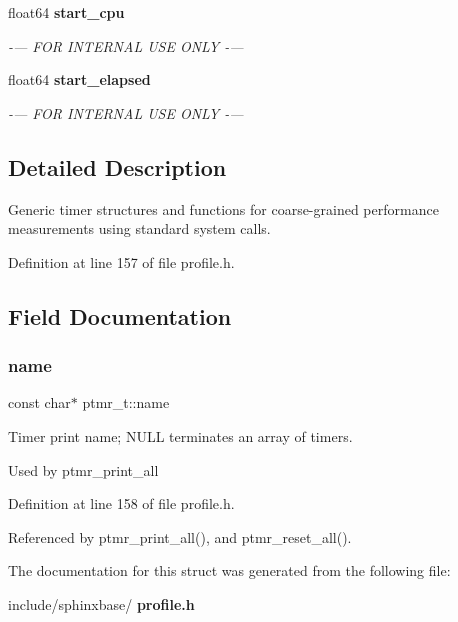 \begin{DoxyCompactItemize}
\mbox{\label{structptmr__t_a85c0c5f0e321cf11fb478b92a05223e8}} 
float64 \textbf{ start\+\_\+cpu}
\begin{DoxyCompactList}\small\item\em -\/--- F\+OR I\+N\+T\+E\+R\+N\+AL U\+SE O\+N\+LY -\/--- \end{DoxyCompactList}\item 
\mbox{\label{structptmr__t_a1702b16a6c6bcb82f6c636f5e68af188}} 
float64 \textbf{ start\+\_\+elapsed}
\begin{DoxyCompactList}\small\item\em -\/--- F\+OR I\+N\+T\+E\+R\+N\+AL U\+SE O\+N\+LY -\/--- \end{DoxyCompactList}\end{DoxyCompactItemize}


\subsection{Detailed Description}
Generic timer structures and functions for coarse-\/grained performance measurements using standard system calls. 

Definition at line 157 of file profile.\+h.



\subsection{Field Documentation}
\mbox{\label{structptmr__t_a73b51c5a047300d77b3a82a7dcaf44f1}} 
\subsubsection{name}
{\footnotesize\ttfamily const char$\ast$ ptmr\+\_\+t\+::name}



Timer print name; N\+U\+LL terminates an array of timers. 

Used by ptmr\+\_\+print\+\_\+all 

Definition at line 158 of file profile.\+h.



Referenced by ptmr\+\_\+print\+\_\+all(), and ptmr\+\_\+reset\+\_\+all().



The documentation for this struct was generated from the following file\+:\begin{DoxyCompactItemize}
\item 
include/sphinxbase/\textbf{ profile.\+h}\end{DoxyCompactItemize}
